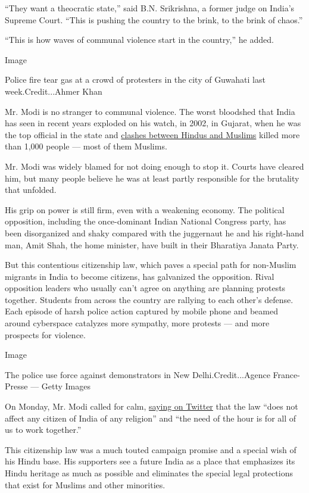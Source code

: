 ``They want a theocratic state,'' said B.N. Srikrishna, a former judge
on India's Supreme Court. ``This is pushing the country to the brink, to
the brink of chaos.''

``This is how waves of communal violence start in the country,'' he
added.

Image

Police fire tear gas at a crowd of protesters in the city of Guwahati
last week.Credit...Ahmer Khan

Mr. Modi is no stranger to communal violence. The worst bloodshed that
India has seen in recent years exploded on his watch, in 2002, in
Gujarat, when he was the top official in the state and
\href{https://www.nytimes.com/interactive/2014/04/06/world/asia/modi-gujarat-riots-timeline.html\#/\#time287_8514}{clashes
between Hindus and Muslims} killed more than 1,000 people --- most of
them Muslims.

Mr. Modi was widely blamed for not doing enough to stop it. Courts have
cleared him, but many people believe he was at least partly responsible
for the brutality that unfolded.

His grip on power is still firm, even with a weakening economy. The
political opposition, including the once-dominant Indian National
Congress party, has been disorganized and shaky compared with the
juggernaut he and his right-hand man, Amit Shah, the home minister, have
built in their Bharatiya Janata Party.

But this contentious citizenship law, which paves a special path for
non-Muslim migrants in India to become citizens, has galvanized the
opposition. Rival opposition leaders who usually can't agree on anything
are planning protests together. Students from across the country are
rallying to each other's defense. Each episode of harsh police action
captured by mobile phone and beamed around cyberspace catalyzes more
sympathy, more protests --- and more prospects for violence.

Image

The police use force against demonstrators in New Delhi.Credit...Agence
France-Presse --- Getty Images

On Monday, Mr. Modi called for calm,
\href{https://twitter.com/narendramodi}{saying on Twitter} that the law
``does not affect any citizen of India of any religion'' and ``the need
of the hour is for all of us to work together.''

This citizenship law was a much touted campaign promise and a special
wish of his Hindu base. His supporters see a future India as a place
that emphasizes its Hindu heritage as much as possible and eliminates
the special legal protections that exist for Muslims and other
minorities.


